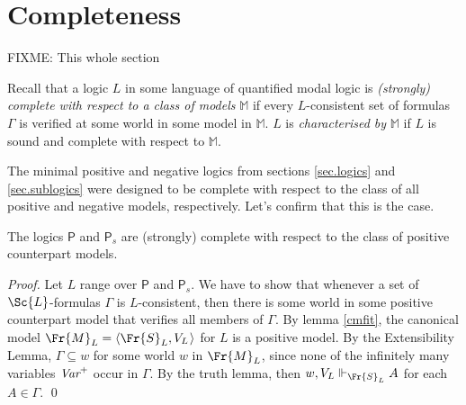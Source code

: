 \documentclass[11pt]{woarticle}
\newcommand{\cmnt}[1]{\iffalse #1 \fi}
\theoremstyle{break}
\theoremstyle{nonumberplain}
\newcommand{\s}[1]{\ensuremath{\mathsf{#1}}}
\newcommand{\SAT}{\Vdash}
\newcommand{\1}{\;\,|\;\,}
\renewcommand{\t}[1]{\ensuremath{\langle #1  \makebox[.2ex]{}\rangle}}
\begin{document}
\cmnt{
  Where do I need the strong form of (LL) that allows $x=y \then \Box
  Fx \then \Box Fy$? Suppose we remove it from the logic. Then $\{
  x\!=\!y, \Box Fx, \neg \Box Fy = \Diamond \neg Fy \}$ is consistent,
  and can be extended to a Henkin set $w$. The existence lemma
  requires that $\{ \neg Fy^\tau, Fx^\tau \}$ can be extended to a
  Henkin set $w'$. That's fine. But it also requires that $wRw'$,
  which by clause (x) of $R$ means that there is a new variable $z$
  s.t. $\{ z\!=\!y^\tau, Fz \} \subseteq w'$. But then $w'$ is
  inconsistent. So the strong form of (LL) is needed in the existence
  lemma to ensure $wRw'$.
}

\section{Completeness}\label{sec:completeness}

FIXME: This whole section

Recall that a logic $L$ in some language of quantified modal logic is
\emph{(strongly) complete with respect to a class of models}
$\mathbb{M}$ if every $L$-consistent set of formulas $\Gamma$ is
verified at some world in some model in $\mathbb{M}$. $L$ is
\emph{characterised by} $\mathbb{M}$ if $L$ is sound and complete with
respect to $\mathbb{M}$.

The minimal positive and negative logics from sections
\ref{sec.logics} and \ref{sec.sublogics} were designed to be complete
with respect to the class of all positive and negative models,
respectively. Let's confirm that this is the case.

\begin{theorem}[Completeness of \s{P} and $\s{P}_s$]
  The logics \s{P} and $\s{P}_s$ are (strongly) complete with respect
  to the class of positive counterpart models.
\end{theorem}
\begin{proof}
  Let $L$ range over \s{P} and $\s{P}_s$.  We have to show that
  whenever a set of $\Sc{L}$-formulas $\Gamma$ is $L$-consistent, then
  there is some world in some positive counterpart model that verifies
  all members of $\Gamma$. By lemma \ref{cmfit}, the canonical model
  $\Fr{M}_L = \t{\Fr{S}_L, V_L}$ for $L$ is a positive model. By the
  Extensibility Lemma, $\Gamma \subseteq w$ for some world $w$ in
  $\Fr{M}_{L}$, since none of the infinitely many variables
  $\emph{Var}^+$ occur in $\Gamma$. By the truth lemma, then $w,V_L
  \SAT_{\Fr{S}_L} A$ for each $A \in \Gamma$. \qed
\end{proof}
\end{document}
